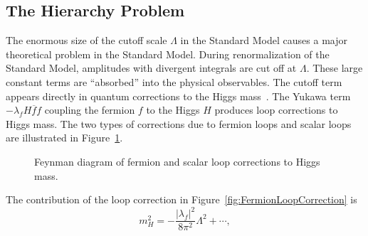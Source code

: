 \subsection{The Hierarchy Problem}
The enormous size of the cutoff scale $\Lambda$ in the Standard Model causes a
major theoretical problem in the Standard Model.  During renormalization of the
Standard Model, amplitudes with divergent integrals are cut off at $\Lambda$.
These large constant terms are ``absorbed'' into the physical observables.  The
cutoff term appears directly in quantum corrections to the Higgs
mass~\cite{Martin:1997um}.  The Yukawa term $-\lambda_f H \overline f f$
coupling the fermion $f$ to the Higgs $H$ produces loop corrections to Higgs
mass.  The two types of corrections due to fermion loops and scalar loops are
illustrated in Figure~\ref{fig:HiggsMassLoopCorrections}.
\begin{figure}
  \centering
  \hspace{15mm}
  \caption[Loop corrections to Higgs mass]{Feynman diagram of
  fermion  and scalar
   loop corrections to Higgs mass.}
  \label{fig:HiggsMassLoopCorrections}
\end{figure}
The contribution of the loop correction in
Figure~\ref{fig:FermionLoopCorrection} is~\cite{Martin:1997um} 
\begin{equation}
  m^2_H = -\frac{|\lambda_f|^2}{8 \pi^2} \Lambda^2 + \cdots,
  \label{eq:HiggsMassCorrection}
\end{equation}
